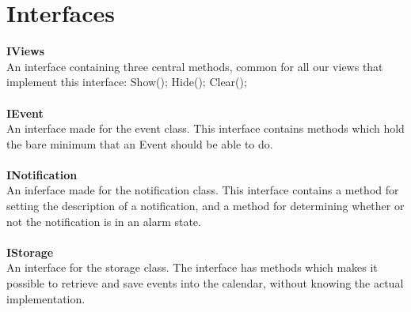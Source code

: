 \section{Interfaces}

\textbf{IViews\\}
An interface containing three central methods, common for all our views that implement this interface:
Show();
Hide();
Clear();\\\\
\textbf{IEvent\\}
An interface made for the event class. This interface contains methods which hold the bare minimum that an Event should be able to do.\\\\
\textbf{INotification\\}
An inferface made for the notification class. This interface contains a method for setting the description of a notification, and a method for determining whether or not the notification is in an alarm state.\\\\
\textbf{IStorage\\}
An interface for the storage class. The interface has methods which makes it possible to retrieve and save events into the calendar, without knowing the actual implementation.